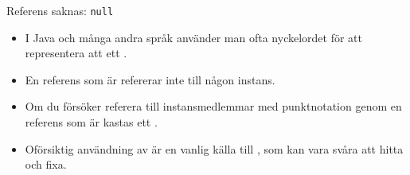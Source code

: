 %
%
%
%
%



\begin{Slide}{Referens saknas: \texttt{null}}
\begin{itemize}
\item I Java och många andra språk använder man ofta nyckelordet  för att representera att ett .

\item En referens som är  refererar inte till någon instans.

\item Om du försöker referera till instansmedlemmar med punktnotation genom en referens som är  kastas ett  .

\item Oförsiktig användning av  är en vanlig källa till , som kan vara svåra att hitta och fixa.

\end{itemize}
\end{Slide}


